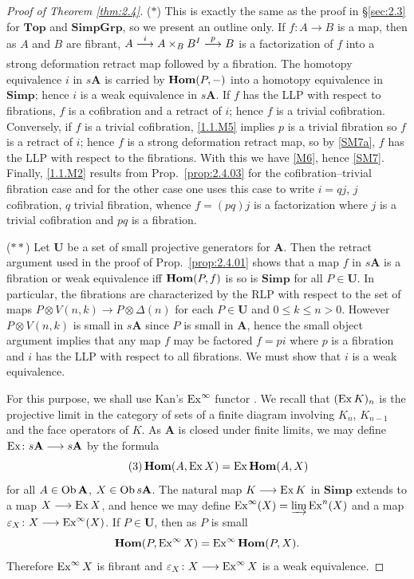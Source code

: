 \documentclass[../main]{subfiles}
\begin{document}
\begin{proof}[Proof of Theorem \ref{thm:2.4}]
($\ast$) This is exactly the same as the proof in \S\ref{sec:2.3} for $\mathbf{Top}$ and $\mathbf{SimpGrp}$, so we present an outline only. If $f \colon A \longrightarrow B$ is a map, then as $A$ and $B$ are fibrant, $A \varrightarrow i A \times_B B^I \varrightarrow p B$ is a factorization of $f$ into a strong deformation retract map followed by a fibration. The homotopy equivalence $i$ in $s \mathbf{A}$ is carried by $\operatorname{\mathbf{Hom}}(P, -)$ into a homotopy equivalence in $\mathbf{Simp}$; hence $i$ is a weak equivalence in $s\mathbf{A}$. If $f$ has the LLP with respect to fibrations, $f$ is a cofibration and a retract of $i$; hence $f$ is a trivial cofibration. Conversely, if $f$ is a trivial cofibration, \ref{1.1.M5} implies $p$ is a trivial fibration so $f$ is a retract of $i$; hence $f$ is a strong deformation retract map, so by \ref{SM7a}, $f$ has the LLP with respect to the fibrations. With this we have \ref{M6}, hence \ref{SM7}. Finally, \ref{1.1.M2} results from Prop.\ \ref{prop:2.4.03} for the cofibration--trivial fibration case and for the other case one uses this case to write $i = qj$, $j$ cofibration, $q$ trivial fibration, whence $f = (pq)j$ is a factorization where $j$ is a trivial cofibration and $pq$ is a fibration.

($\ast\ast$) Let $\mathbf{U}$ be a set of small projective generators for $\mathbf{A}$. Then the retract argument used in the proof of Prop.\ \ref{prop:2.4.01} shows that a map $f$ in $s\mathbf{A}$ is a fibration or weak equivalence iff $\operatorname{\mathbf{Hom}}(P, f)$ is so is $\mathbf{Simp}$ for all $P \in \mathbf{U}$. In particular, the fibrations are characterized by the RLP with respect to the set of maps $P \otimes V(n, k) \longrightarrow P \otimes \Delta(n)$ for each $P \in \mathbf{U}$ and $0 \leq k \leq n >0$. However $P \otimes V(n, k)$ is small in $s \mathbf{A}$  since $P$ is small in $\mathbf{A}$, hence the small object argument implies that any map $f$ may be factored $f = pi$ where $p$ is a fibration and $i$ has the LLP with respect to all fibrations. We must show that $i$ is a weak equivalence. 

For this purpose, we shall use Kan's $\operatorname{Ex}^\infty$ functor \cite{kan_css_1957-1}. We recall that $(\operatorname{Ex} K)_n$ is the projective limit in the category of sets of a finite diagram involving $K_n$, $K_{n-1}$ and the face operators of $K$. As $\mathbf{A}$ is closed under finite limits, we may define $\operatorname{Ex} \colon s \mathbf{A} \longrightarrow s \mathbf{A}$ by the formula
\begin{equation}\tag{3}
\label{eq:2.4.3}
    \operatorname{\mathbf{Hom}}(A, \operatorname{Ex} X) = \operatorname{Ex} \operatorname{\mathbf{Hom}}(A, X)
\end{equation}
for all $A \in \operatorname{Ob} \mathbf{A}$, $X \in \operatorname{Ob} s \mathbf{A}$. The natural map $K \longrightarrow \operatorname{Ex} K$ in $\mathbf{Simp}$ extends to a map $X \longrightarrow \operatorname{Ex} X$, and hence we may define $\operatorname{Ex}^\infty(X) = \varinjlim \operatorname{Ex}^n(X)$ and a map $\varepsilon_X \colon X \longrightarrow \operatorname{Ex}^\infty(X)$. If $P \in \mathbf{U}$, then as $P$ is small
\[\operatorname{\mathbf{Hom}}(P, \operatorname{Ex}^\infty X) = \operatorname{Ex}^\infty \operatorname{\mathbf{Hom}}(P,X).\] Therefore $\operatorname{Ex}^\infty X$ is fibrant and $\varepsilon_X \colon X \longrightarrow \operatorname{Ex}^\infty X$ is a weak equivalence.


\end{proof}
\end{document}
